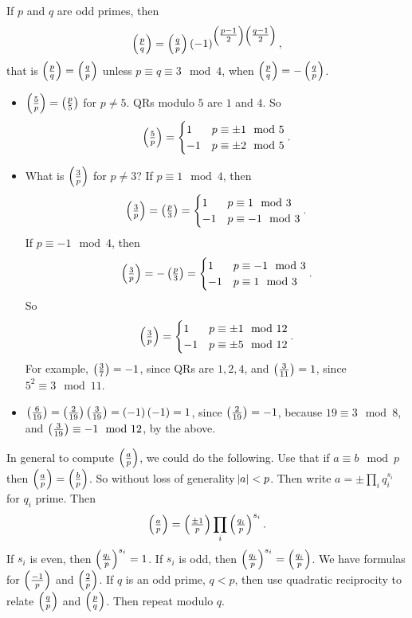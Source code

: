 \begin{theorem}
\label{thm:40}
If $ p $ and $ q $ are odd primes, then
$$ \jacobi{p}{q} = \jacobi{q}{p}\br{-1}^{\br{\tfrac{p - 1}{2}}\br{\tfrac{q - 1}{2}}}, $$
that is $ \jacobi{p}{q} = \jacobi{q}{p} $ unless $ p \equiv q \equiv 3 \mod 4 $, when $ \jacobi{p}{q} = -\jacobi{q}{p} $.
\end{theorem}

\begin{example*}
\hfill
\begin{itemize}
\item $ \jacobi{5}{p} = \jacobi{p}{5} $ for $ p \ne 5 $. QRs modulo $ 5 $ are $ 1 $ and $ 4 $. So
$$ \jacobi{5}{p} =
\begin{cases}
1 & p \equiv \pm 1 \mod 5 \\
-1 & p \equiv \pm 2 \mod 5
\end{cases}.
$$

\item What is $ \jacobi{3}{p} $ for $ p \ne 3 $? If $ p \equiv 1 \mod 4 $, then
$$ \jacobi{3}{p} = \jacobi{p}{3} =
\begin{cases}
1 & p \equiv 1 \mod 3 \\
-1 & p \equiv -1 \mod 3
\end{cases}.
$$
If $ p \equiv -1 \mod 4 $, then
$$ \jacobi{3}{p} = -\jacobi{p}{3} =
\begin{cases}
1 & p \equiv -1 \mod 3 \\
-1 & p \equiv 1 \mod 3
\end{cases}.
$$
So
$$ \jacobi{3}{p} =
\begin{cases}
1 & p \equiv \pm 1 \mod 12 \\
-1 & p \equiv \pm 5 \mod 12
\end{cases}.
$$
For example, $ \jacobi{3}{7} = -1 $, since QRs are $ 1, 2, 4 $, and $ \jacobi{3}{11} = 1 $, since $ 5^2 \equiv 3 \mod 11 $.
\item $ \jacobi{6}{19} = \jacobi{2}{19}\jacobi{3}{19} = \br{-1}\br{-1} = 1 $, since $ \jacobi{2}{19} = -1 $, because $ 19 \equiv 3 \mod 8 $, and $ \jacobi{3}{19} \equiv -1 \mod 12 $, by the above.
\end{itemize}
\end{example*}

In general to compute $ \jacobi{a}{p} $, we could do the following. Use that if $ a \equiv b \mod p $ then $ \jacobi{a}{p} = \jacobi{b}{p} $. So without loss of generality $ \abs{a} < p $. Then write $ a = \pm\prod_i q_i^{s_i} $ for $ q_i $ prime. Then
$$ \jacobi{a}{p} = \jacobi{\pm 1}{p} \prod_i \jacobi{q_i}{p}^{s_i}. $$
If $ s_i $ is even, then $ \jacobi{q_i}{p}^{s_i} = 1 $. If $ s_i $ is odd, then $ \jacobi{q_i}{p}^{s_i} = \jacobi{q_i}{p} $. We have formulas for $ \jacobi{-1}{p} $ and $ \jacobi{2}{p} $. If $ q $ is an odd prime, $ q < p $, then use quadratic reciprocity to relate $ \jacobi{q}{p} $ and $ \jacobi{p}{q} $. Then repeat modulo $ q $.

